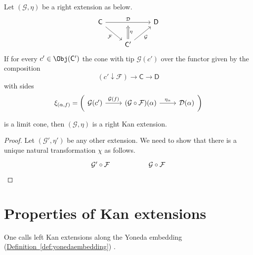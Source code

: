 \documentclass[notes.tex]{subfiles}
\begin{document}
\begin{lemma}
  \label{lemma:extension_whose_cones_are_limits_is_kan}
  Let $(\mathcal{G}, \eta)$ be a right extension as below.
  \begin{equation*}
    \begin{tikzcd}
      \mathsf{C}
      \arrow[dr, swap, "\mathcal{F}"]
      \arrow[rr, "\mathcal{D}", ""'{name=U}]
      && \mathsf{D}
      \\
      & \mathsf{C'}
      \arrow[ur, swap, "\mathcal{G}"]
      \arrow[d, to=U, Rightarrow, swap, "\eta"]
    \end{tikzcd}
  \end{equation*}
  If for every $c' \in \Obj(\mathsf{C'})$ the cone with tip $\mathcal{G}(c')$ over the functor given by the composition
  \begin{equation*}
    (c' \downarrow \mathcal{F}) \to \mathsf{C} \to \mathsf{D}
  \end{equation*}
  with sides
  \begin{equation*}
    \xi_{(\alpha, f)} = \left( \begin{tikzcd} \mathcal{G}(c') \arrow[r, "\mathcal{G}(f)"] & (\mathcal{G} \circ \mathcal{F})(\alpha) \arrow[r, "\eta_{\alpha}"] & \mathcal{D}(\alpha) \end{tikzcd} \right)
  \end{equation*}

  is a limit cone, then $(\mathcal{G}, \eta)$ is a right Kan extension.
\end{lemma}
\begin{proof}
  Let $(\mathcal{G}', \eta')$ be any other extension. We need to show that there is a unique natural transformation $\chi$ as follows.
  \begin{equation*}
    \begin{tikzcd}
      \mathcal{G}' \circ \mathcal{F}
      && \mathcal{G} \circ \mathcal{F}
    \end{tikzcd}
  \end{equation*}
\end{proof}

\section{Properties of Kan extensions}
\label{sec:properties_of_kan_extensions}

\begin{definition}
  \label{def:yoneda_extension}
  One calls left Kan extensions along the Yoneda embedding (\hyperref[def:yonedaembedding]{Definition~\ref*{def:yonedaembedding}}) .
\end{definition}
\end{document}
